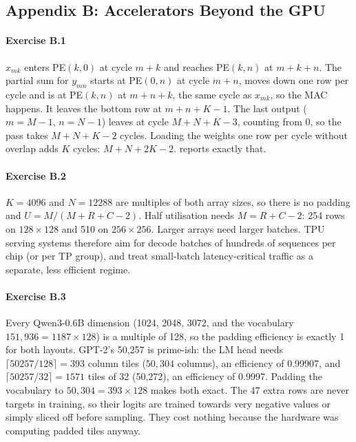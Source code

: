 \subsection*{Appendix B: Accelerators Beyond the GPU}

\paragraph{Exercise B.1}
$x_{mk}$ enters PE$(k,0)$ at cycle $m+k$ and reaches PE$(k,n)$ at $m+k+n$. The partial sum for
$y_{mn}$ starts at PE$(0,n)$ at cycle $m+n$, moves down one row per cycle and is at PE$(k,n)$ at
$m+n+k$, the same cycle as $x_{mk}$, so the MAC happens. It leaves the bottom row at $m+n+K-1$. The
last output ($m=M-1$, $n=N-1$) leaves at cycle $M+N+K-3$, counting from 0, so the pass takes
$M+N+K-2$ cycles. Loading the weights one row per cycle without overlap adds $K$ cycles:
$M+N+2K-2$.  reports exactly that.

\paragraph{Exercise B.2}
$K=4096$ and $N=12288$ are multiples of both array sizes, so there is no padding and
$U = M/(M+R+C-2)$. Half utilisation needs $M=R+C-2$: 254 rows on $128\times128$ and 510 on
$256\times256$. Larger arrays need larger batches. TPU serving systems therefore aim for decode
batches of hundreds of sequences per chip (or per TP group), and treat small-batch latency-critical
traffic as a separate, less efficient regime.

\paragraph{Exercise B.3}
Every Qwen3-0.6B dimension (1024, 2048, 3072, and the vocabulary $151{,}936 = 1187\times128$) is a
multiple of 128, so the padding efficiency is exactly 1 for both layouts. GPT-2's 50{,}257 is prime-ish:
the LM head needs $\lceil 50257/128\rceil = 393$ column tiles ($50{,}304$ columns), an efficiency of
0.99907, and $\lceil50257/32\rceil=1571$ tiles of 32 (50{,}272), an efficiency of 0.9997. Padding the vocabulary
to $50{,}304 = 393\times128$ makes both exact. The 47 extra rows are never targets in training, so
their logits are trained towards very negative values or simply sliced off before sampling. They
cost nothing because the hardware was computing padded tiles anyway.

